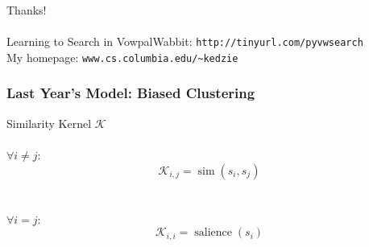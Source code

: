 \documentclass{beamer}
\begin{document}
\begin{frame}
    \begin{center}
    \def\svgwidth{\columnwidth}
        \resizebox{.97\textwidth}{!}{}
    \end{center}
\end{frame}

\begin{frame}
    \begin{center}
    \def\svgwidth{\columnwidth}
        \resizebox{.97\textwidth}{!}{}
    \end{center}
\end{frame}



\begin{frame}
    \begin{center}
    \def\svgwidth{\columnwidth}
        \resizebox{.97\textwidth}{!}{}
    \end{center}
\end{frame}

\begin{frame}
Thanks!\\
~\\
Learning to Search in VowpalWabbit: \texttt{http://tinyurl.com/pyvwsearch}
~\\
My homepage: \texttt{www.cs.columbia.edu/\textasciitilde kedzie}

\end{frame}

\begin{frame}
\frametitle{Last Year's Model: Biased Clustering}

Similarity Kernel $\mathcal{K}$\\
~\\
$\forall i \ne j$:
\[\mathcal{K}_{i,j} = \operatorname{sim}(s_i,s_j)\]\\
~\\
$\forall i = j$:\\
\[\mathcal{K}_{i,i} = \operatorname{salience}(s_i)\]\\
\end{frame}
\end{document}
